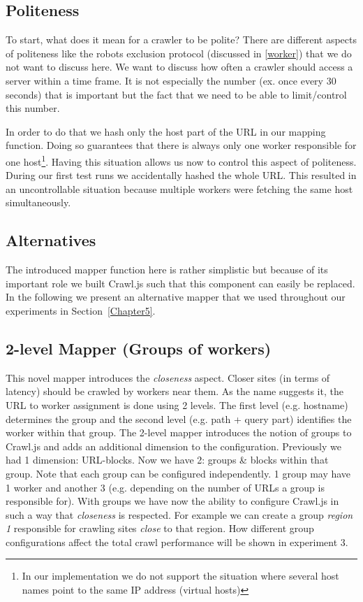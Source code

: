 \subsection{Politeness}
To start, what does it mean for a crawler to be polite? There are different aspects of politeness like the robots exclusion protocol (discussed in \ref{worker}) that we do not want to discuss here. We want to discuss how often a crawler should access a server within a time frame. It is not especially the number (ex. once every 30 seconds) that is important but the fact that we need to be able to limit/control this number.

In order to do that we hash only the host part of the URL in our mapping function. Doing so guarantees that there is always only one worker responsible for one host\footnote{In our implementation we do not support the situation where several host names point to the same IP address (virtual hosts)}. Having this situation allows us now to control this aspect of politeness.
During our first test runs we accidentally hashed the whole URL. This resulted in an uncontrollable situation because multiple workers were fetching the same host simultaneously.

\subsection{Alternatives}
The introduced mapper function here is rather simplistic but because of its important role we built Crawl.js such that this component can easily be replaced. In the following we present an alternative mapper that we used throughout our experiments in Section~\ref{Chapter5}.

\subsection{2-level Mapper (Groups of workers)}
This novel mapper introduces the \emph{closeness} aspect. Closer sites (in terms of latency) should be crawled by workers near them. 
\newline
As the name suggests it, the URL to worker assignment is done using 2 levels. The first level (e.g. hostname) determines the group and the second level (e.g. path + query part) identifies the worker within that group. The 2-level mapper introduces the notion of groups to Crawl.js and adds an additional dimension to the configuration. Previously we had 1 dimension: URL-blocks. Now we have 2: groups \& blocks within that group. Note that each group can be configured independently. 1 group may have 1 worker and another 3 (e.g. depending on the number of URLs a group is responsible for).
\newline
With groups we have now the ability to configure Crawl.js in such a way that \emph{closeness} is respected. For example we can create a group \emph{region 1} responsible for crawling sites \emph{close} to that region. How different group configurations affect the total crawl performance will be shown in experiment 3.

